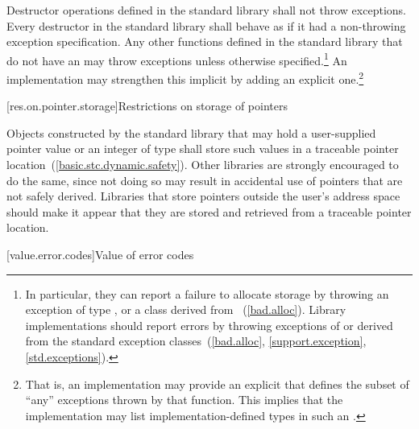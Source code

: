\pnum
Destructor operations defined in the \Cpp standard library
shall not throw exceptions.
Every destructor in the \Cpp standard library shall behave as if it had a
non-throwing exception specification.
Any other functions defined in the
\Cpp standard library
%
that do not have an
may throw  exceptions
unless otherwise specified.\footnote{In particular, they
can report a failure to allocate storage by throwing an exception of type
,
or a class derived from
~(\ref{bad.alloc}).
Library implementations should
report errors by throwing exceptions of or derived
from the standard exception classes~(\ref{bad.alloc},
\ref{support.exception}, \ref{std.exceptions}).}
An implementation may strengthen this implicit
by adding an explicit one.\footnote{That is, an implementation may provide an explicit
that defines the subset of ``any'' exceptions thrown by that function.
This implies that the implementation may list implementation-defined types
in such an
%
%
.}

[res.on.pointer.storage]{Restrictions on storage of pointers}

\pnum
{}%
%
Objects constructed by the standard library that may hold a user-supplied pointer value
or an integer of type  shall store such values in a traceable
pointer location~(\ref{basic.stc.dynamic.safety}). \enternote Other libraries are
strongly encouraged to do the same, since not doing so may result in accidental use of
pointers that are not safely derived. Libraries that store pointers outside the user's
address space should make it appear that they are stored and retrieved from a traceable
pointer location. \exitnote

[value.error.codes]{Value of error codes}

